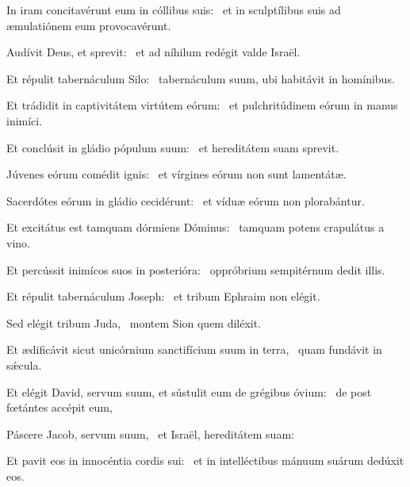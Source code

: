 \item In iram concitavérunt eum in cóllibus suis:~\psstar{} et in sculptílibus suis ad æmulatiónem eum provocavérunt.

\item Audívit Deus, et sprevit:~\psstar{} et ad níhilum redégit valde Israël.

\item Et répulit tabernáculum Silo:~\psstar{} tabernáculum suum, ubi habitávit in homínibus.

\item Et trádidit in captivitátem virtútem eórum:~\psstar{} et pulchritúdinem eórum in manus inimíci.

\item Et conclúsit in gládio pópulum suum:~\psstar{} et hereditátem suam sprevit.

\item Júvenes eórum comédit ignis:~\psstar{} et vírgines eórum non sunt lamentátæ.

\item Sacerdótes eórum in gládio cecidérunt:~\psstar{} et víduæ eórum non plorabántur.

\item Et excitátus est tamquam dórmiens Dóminus:~\psstar{} tamquam potens crapulátus a vino.

\item Et percússit inimícos suos in posterióra:~\psstar{} oppróbrium sempitérnum dedit illis.

\item Et répulit tabernáculum Joseph:~\psstar{} et tribum Ephraim non elégit.

\item Sed elégit tribum Juda,~\psstar{} montem Sion quem diléxit.

\item Et ædificávit sicut unicórnium sanctifícium suum in terra,~\psstar{} quam fundávit in sǽcula.

\item Et elégit David, servum suum, et sústulit eum de grégibus óvium:~\psstar{} de post fœtántes accépit eum,

\item Páscere Jacob, servum suum,~\psstar{} et Israël, hereditátem suam:

\item Et pavit eos in innocéntia cordis sui:~\psstar{} et in intelléctibus mánuum suárum dedúxit eos.